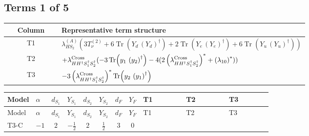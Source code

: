 \documentclass[8pt]{article}
\begin{document}
\begin{landscape}
\subsection*{Terms 1 of 5}
\begin{center}
\begin{tabular}{@{}c >{\raggedright\arraybackslash}p{0.82\linewidth}@{}}
\toprule
Column & Representative term structure \\
\midrule
T1 & \(\displaystyle {\lambda_{HS_2}^{(A)}} (3 T_{\nu}^{(2)}+6 \operatorname{Tr}\!\left({Y_d}\,\left({Y_d}\right)^{\dagger}\right)+2 \operatorname{Tr}\!\left({Y_e}\,\left({Y_e}\right)^{\dagger}\right)+6 \operatorname{Tr}\!\left({Y_u}\,\left({Y_u}\right)^{\dagger}\right))\) \\
\midrule
T2 & \(\displaystyle +{\lambda_{H H^\dagger S_1^\dagger S_2^\dagger}^{\rm Cross}} (-3 \operatorname{Tr}\!\left({y_1}\,\left({y_2}\right)^{\dagger}\right)-4 (2 \left({\lambda_{H H^\dagger S_1^\dagger S_2^\dagger}^{\rm Cross}}\right)^{*}+\left({\lambda_{10}}\right)^{*}))\) \\
\midrule
T3 & \(\displaystyle -3 \left({\lambda_{H H^\dagger S_1^\dagger S_2^\dagger}^{\rm Cross}}\right)^{*} \operatorname{Tr}\!\left({y_2}\,\left({y_1}\right)^{\dagger}\right)\) \\
\midrule
\bottomrule
\end{tabular}
\end{center}
\smallskip
\tiny
\begin{longtable}{@{}llcccccc >{\raggedright\arraybackslash}p{0.21\linewidth} >{\raggedright\arraybackslash}p{0.21\linewidth} >{\raggedright\arraybackslash}p{0.21\linewidth}@{}}
\toprule
Model & $\alpha$ & $d_{S_1}$ & $Y_{S_1}$ & $d_{S_2}$ & $Y_{S_2}$ & $d_F$ & $Y_F$ & T1 & T2 & T3 \\
\midrule
\endfirsthead
\toprule
Model & $\alpha$ & $d_{S_1}$ & $Y_{S_1}$ & $d_{S_2}$ & $Y_{S_2}$ & $d_F$ & $Y_F$ & T1 & T2 & T3 \\
\midrule
\endhead
T3-C & $-1$ & $2$ & $-\frac{1}{2}$ & $2$ & $\frac{1}{2}$ & $3$ & $0$ & \scriptsize\adjustbox{max width=\linewidth}{$\begin{gathered} {\lambda_{HS_2}^{(A)}} (3 T_{\nu}^{(2)}+6 \operatorname{Tr}\!\left({Y_d}\,\left({Y_d}\right)^{\dagger}\right)+2 \operatorname{Tr}\!\left({Y_e}\,\left({Y_e}\right)^{\dagger}\right)+6 \operatorname{Tr}\!\left({Y_u}\,\left({Y_u}\right)^{\dagger}\right))\end{gathered}$} & \scriptsize\adjustbox{max width=\linewidth}{$\begin{gathered} +{\lambda_{H H^\dagger S_1^\dagger S_2^\dagger}^{\rm Cross}} (-3 \operatorname{Tr}\!\left({y_1}\,\left({y_2}\right)^{\dagger}\right)-4 (2 \left({\lambda_{H H^\dagger S_1^\dagger S_2^\dagger}^{\rm Cross}}\right)^{*}+\left({\lambda_{10}}\right)^{*}))\end{gathered}$} & \scriptsize\adjustbox{max width=\linewidth}{$\begin{gathered} -3 \left({\lambda_{H H^\dagger S_1^\dagger S_2^\dagger}^{\rm Cross}}\right)^{*} \operatorname{Tr}\!\left({y_2}\,\left({y_1}\right)^{\dagger}\right)\end{gathered}$} \\

\end{longtable}
\end{landscape}
\end{document}
